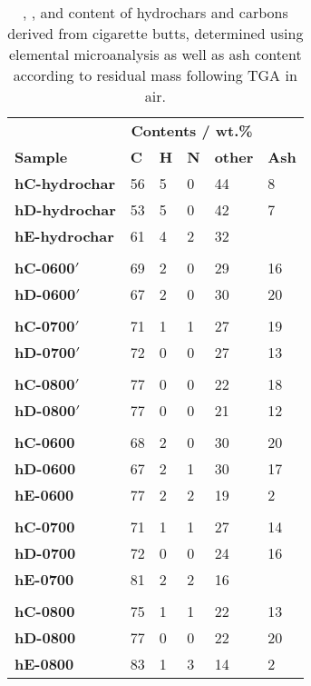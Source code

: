 \begin{table}[ht!]
    \caption{, , and  content of hydrochars and carbons derived from cigarette butts, determined using elemental microanalysis as well as ash content according to residual mass following TGA in air.}
    \label{tb:chn_ash}
    \begin{tabularx}{\textwidth}{lXXXX|X}
    \toprule
        & \multicolumn{4}{c}{\textbf{Contents / wt.\%}} \\
        \textbf{Sample} & \textbf{C} & \textbf{H} & \textbf{N} & \textbf{other} & \textbf{Ash} \\
    \midrule
        \textbf{hC-hydrochar} & 56 & 5 & 0 & 44 & 8 \\
        \textbf{hD-hydrochar} & 53 & 5 & 0 & 42 & 7 \\
        \textbf{hE-hydrochar} & 61 & 4 & 2 & 32 & \\
        &&&&&\\
        \textbf{hC-0600$'$} & 69 & 2 & 0 & 29 & 16 \\
        \textbf{hD-0600$'$} & 67 & 2 & 0 & 30 & 20 \\
        &&&&&\\
        \textbf{hC-0700$'$} & 71 & 1 & 1 & 27 & 19 \\
        \textbf{hD-0700$'$} & 72 & 0 & 0 & 27 & 13\\
        &&&&&\\
        \textbf{hC-0800$'$} & 77 & 0 & 0 & 22 & 18 \\
        \textbf{hD-0800$'$} & 77 & 0 & 0 & 21 & 12 \\
        &&&&&\\
        \textbf{hC-0600} & 68 & 2 & 0 & 30 & 20 \\
        \textbf{hD-0600} & 67 & 2 & 1 & 30 & 17 \\
        \textbf{hE-0600} & 77 & 2 & 2 & 19 & 2 \\
        &&&&&\\
        \textbf{hC-0700} & 71 & 1 & 1 & 27 & 14 \\
        \textbf{hD-0700} & 72 & 0 & 0 & 24 & 16 \\
        \textbf{hE-0700} & 81 & 2 & 2 & 16 & \\
        &&&&&\\
        \textbf{hC-0800} & 75 & 1 & 1 & 22 & 13 \\
        \textbf{hD-0800} & 77 & 0 & 0 & 22 & 20 \\
        \textbf{hE-0800} & 83 & 1 & 3 & 14 & 2 \\

\end{tabularx}
\end{table}
